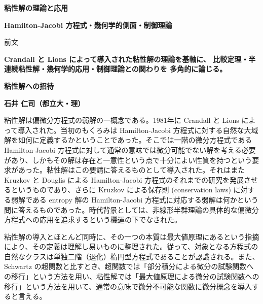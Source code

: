 \documentclass[uplatex,dvipdfmx]{jlreq}
\begin{document}
\begin{center}
  \vspace*{20pt}
  {\Huge\bfseries 粘性解の理論と応用}

  \vspace{30pt}

  {\Large\bfseries Hamilton-Jacobi 方程式・幾何学的側面・制御理論}

  \vspace{50pt}

  {\large 前文}

  \vspace{10pt}

  \parbox{0.85\textwidth}{
    \large\bfseries
    Crandall と Lions によって導入された粘性解の理論を基軸に、
    比較定理・半連続粘性解・幾何学的応用・制御理論との関わりを
    多角的に論じる。
  }
\end{center}

\vfill

\newpage

\begin{center}
{\large\bfseries 粘性解への招待}
\end{center}

\begin{flushright}
\textbf{石井 仁司（都立大・理）}
\end{flushright}

粘性解は偏微分方程式の弱解の一概念である。1981年に Crandall と Lions によって導入された。当初のもくろみは Hamilton-Jacobi 方程式に対する自然な大域解を如何に定義するかということであった。そこでは一階の微分方程式である Hamilton-Jacobi 方程式に対して通常の意味では微分可能でない解を考える必要があり、しかもその解は存在と一意性という点で十分によい性質を持つという要求があった。粘性解はこの要請に答えるものとして導入された。それはまた Kruzkov と Douglis による Hamilton-Jacobi 方程式のそれまでの研究を発展させるというものであり、さらに Kruzkov による保存則 (conservation laws) に対する弱解である entropy 解の Hamilton-Jacobi 方程式に対応する弱解は何かという問に答えるものであった。時代背景としては、非線形半群理論の具体的な偏微分方程式への応用を追求するという機運の下でなされた。

粘性解の導入とほとんど同時に、その一つの本質は最大値原理にあるという指摘により、その定義は理解し易いものに整理された。従って、対象となる方程式の自然なクラスは単独二階（退化）楕円型方程式であることが認識される。また、Schwartz の超関数と比すとき、超関数では「部分積分による微分の試験関数への移行」という方法を用い、粘性解では「最大値原理による微分の試験関数への移行」という方法を用いて、通常の意味で微分不可能な関数に微分概念を導入すると言える。
\end{document}
